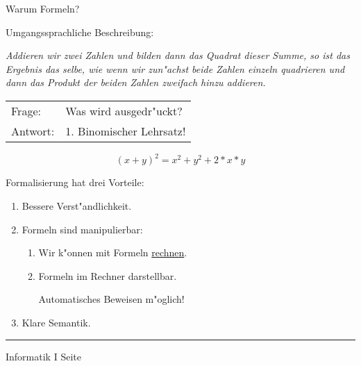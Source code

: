 
\begin{slide}{}
\normalsize
\begin{center}
Warum Formeln?
\end{center}
\vspace{0.5cm}

\footnotesize
Umgangssprachliche Beschreibung: 
\begin{center}
\begin{minipage}[c]{12cm}
{\em 
  Addieren wir zwei Zahlen und bilden dann das Quadrat dieser Summe, so ist das Ergebnis das
  selbe, wie wenn wir zun"achst beide Zahlen einzeln quadrieren und dann das Produkt der beiden
  Zahlen zweifach hinzu addieren.
}
\end{minipage}
\end{center}
\vspace*{0.5cm}

\begin{tabular}[c]{ll}
Frage:   & Was wird ausgedr"uckt? \\[0.5cm]
Antwort: & 1. Binomischer Lehrsatz!
\end{tabular}
$$  (x + y )^2 = x^2 + y^2 + 2*x*y $$

Formalisierung hat drei Vorteile:
\begin{enumerate}
\item Bessere Verst"andlichkeit.
\item Formeln sind manipulierbar:
  \begin{enumerate}
  \item Wir k"onnen mit Formeln \underline{rechnen}.
  \item Formeln im Rechner darstellbar.

        Automatisches Beweisen m"oglich!
  \end{enumerate}
\item Klare Semantik.
\end{enumerate}

\vspace*{\fill}
\tiny \addtocounter{mypage}{1}
\rule{15cm}{1mm}
Informatik I  \hspace*{\fill} Seite 
\end{slide}


